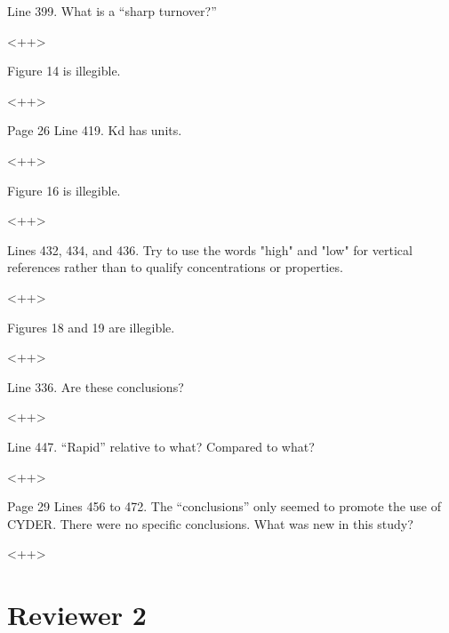 \documentclass[answers,12pt]{exam}
\begin{document}
\begin{questions}
\question Line 399. What is a “sharp turnover?”
\begin{solution}
<++>
\end{solution}

 

\question Figure 14 is illegible.
\begin{solution}
<++>
\end{solution}

 

\question Page 26 Line 419. Kd has units.
\begin{solution}
<++>
\end{solution}

 

\question Figure 16 is illegible.
\begin{solution}
<++>
\end{solution}

 

\question Lines 432, 434, and 436. Try to use the words "high" and "low" for vertical references rather than to qualify concentrations or properties.
\begin{solution}
<++>
\end{solution}

 

\question Figures 18 and 19 are illegible.
\begin{solution}
<++>
\end{solution}

 

\question Line 336. Are these conclusions?
\begin{solution}
<++>
\end{solution}

 

\question Line 447. “Rapid” relative to what? Compared to what?
\begin{solution}
<++>
\end{solution}

 

\question Page 29 Lines 456 to 472. The “conclusions” only seemed to promote the use of CYDER. There were no specific conclusions. What was new in this study? 
\begin{solution}
<++>
\end{solution}


\section*{Reviewer 2}


\end{questions}
\end{document}
